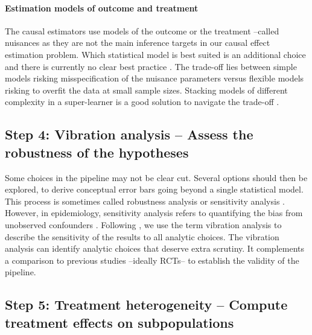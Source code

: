 \documentclass[french,12pt,twoside,a4paper]{book}
\begin{document}
\paragraph{Estimation models of outcome and treatment}

The causal estimators use models of the outcome or the treatment --called
nuisances as they are not the main inference targets in our causal effect
estimation problem. Which statistical model is best suited is an additional
choice and there is currently no clear best practice
\citep{wendling2018comparing, dorie_automated_2019}. The trade-off lies between
simple models risking misspecification of the nuisance parameters versus
flexible models risking to overfit the data at small sample sizes. Stacking
models of different complexity in a super-learner is a good solution to navigate
the trade-off \citep{van2007super,doutreligne2023select}.

\subsection{Step 4: Vibration analysis -- Assess the robustness of the hypotheses}
\label{subsec:causal_tuto:vibration_analysis}%

Some choices in the pipeline may not be clear cut. Several options should then
be explored, to derive conceptual error bars going beyond a single statistical
model. This process is sometimes called robustness analysis
\citep{neumayer2017robustness} or sensitivity analysis
\citep{thabane2013tutorial, hernan2020causal,fda_statistical_2021}. However, in
epidemiology, sensitivity analysis refers to quantifying the bias from
unobserved confounders \citep{schneeweiss2006sensitivity}. Following
\cite{patel2015assessment}, we use the term vibration analysis to describe the
sensitivity of the results to all analytic choices.
%
The vibration analysis can identify analytic choices that deserve extra
scrutiny. It complements a comparison to previous studies --ideally RCTs-- to
establish the validity of the pipeline.



\subsection{Step 5: Treatment heterogeneity -- Compute treatment effects on subpopulations}%
\label{subsec:causal_tuto:heterogeneity}%
\end{document}
